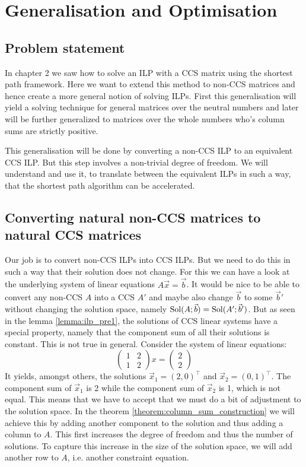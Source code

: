 \chapter{Generalisation and Optimisation}
\section{Problem statement}
In chapter 2 we saw how to solve an ILP with a CCS matrix using the shortest path framework. Here we want to extend this method to non-CCS matrices and hence create a more general notion of solving ILPs. First this generalisation will yield a solving technique for general matrices over the neutral numbers and later will be further generalized to matrices over the whole numbers who's column sums are strictly positive. 

This generalisation will be done by converting a non-CCS ILP to an equivalent CCS ILP. But this step involves a non-trivial degree of freedom. We will understand and use it, to translate between the equivalent ILPs in such a way, that the shortest path algorithm can be accelerated. 

\section{Converting natural non-CCS matrices to natural CCS matrices}
Our job is to convert non-CCS ILPs into CCS ILPs. But we need to do this in such a way that their solution does not change. For this we can have a look at the underlying system of linear equations $A\vec x = \vec b$. It would be nice to be able to convert any non-CCS $A$ into a CCS $A'$ and maybe also change $\vec b$ to some $\vec b'$ without changing the solution space, namely $\operatorname{Sol}(A;\vec b) = \operatorname{Sol}(A';\vec b')$. But as seen in the lemma \ref{lemma:ilp_pre1}, the solutions of CCS linear systems have a special property, namely that the component sum of all their solutions is constant. This is not true in general. Consider the system of linear equations:
$$
\left(\begin{matrix}
    1 & 2\\
    1 & 2
\end{matrix}\right)
x = \left(\begin{matrix}
    2\\2
\end{matrix}\right)
$$
It yields, amongst others, the solutions $\vec x_1 = (2, 0)^\top$ and $\vec x_2 = (0, 1)^\top$. The component sum of $\vec x_1$ is 2 while the component sum of $\vec x_2$ is 1, which is not equal. This means that we have to accept that we must do a bit of adjustment to the solution space. In the theorem \ref{theorem:column_sum_construction} we will achieve this by adding another component to the solution and thus adding a column to $A$. This first increases the degree of freedom and thus the number of solutions. To capture this increase in the size of the solution space, we will add another row to $A$, i.e. another constraint equation.

